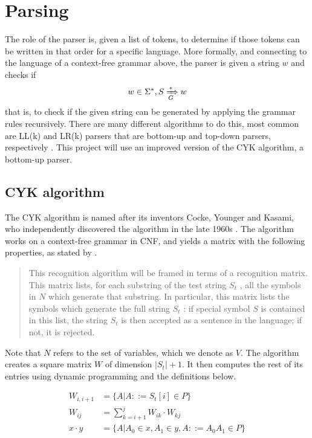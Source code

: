 \documentclass[a4paper,12pt,twosided]{report}
\renewcommand\cite{\citep}
\begin{document}
\section{Parsing}
\label{parsingsection}
The role of the parser is, given a list of tokens, to determine if those tokens
can be written in that order for a specific language. More formally, and
connecting to the language of a context-free grammar above, the parser is given
a string $w$ and checks if 
\[
w \in \Sigma^*, S \xRightarrow[G]{*} w
\]
that is, to check if the given string can be generated by applying the grammar
rules recursively. There are many different algorithms to do this, most common
are LL(k) and LR(k) parsers that are bottom-up and top-down parsers,
respectively \cite[p.192]{dragonbook}. This project will use an improved version
of the CYK algorithm, a bottom-up parser.

\subsection{CYK algorithm}
The CYK algorithm is named after its inventors Cocke, Younger and Kasami, who
independently discovered the algorithm in the late 1960s \cite{Younger67}. The
algorithm works on a context-free grammar in CNF, and yields a matrix with the
following properties, as stated by \citet{Younger67}.

\begin{quote}
This recognition algorithm will be framed in terms of a recognition
matrix. This matrix lists, for each substring of the test string $S_t$ , all
the symbols in $N$ which generate that substring. In particular, this
matrix lists the symbols which generate the full string $S_t$ : if special
symbol $S$ is contained in this list, the string $S_t$ is then accepted as a
sentence in the language; if not, it is rejected.
\end{quote}

Note that $N$ refers to the set of variables, which we denote as $V$. The
algorithm creates a square matrix $W$ of dimension $|S_t|+1$.  It then computes
the rest of its entries using dynamic programming and the definitions below.

\begin{align}
W_{i,i+1} &= \{ A | A ::= S_t[i] \in P \} \\
W_{ij}    &= \sum_{k=i+1}^{j} W_{ik} \cdot W_{kj} \\
x \cdot y &= \{ A | A_0 \in x, A_1 \in y, A ::= A_0A_1 \in P \} \label{abc}
\end{align}
\end{document}
